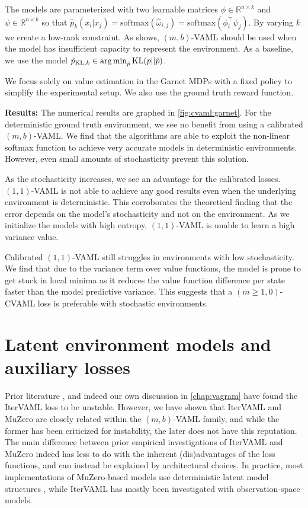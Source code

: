 The models are parameterized with two learnable matrices $\phi \in \mathbb{R}^{n\times k}$ and $\psi \in \mathbb{R}^{n\times k}$ so that $\hat{p}_k(x_i| x_j)  = \mathrm{softmax}(\hat{\omega}_{i,j}) = \mathrm{softmax}(\phi_i^\top \psi_j)$.
By varying $k$ we create a low-rank constraint.
As \textcite{vaml} shows, $(m,b)$-VAML should be used when the model has insufficient capacity to represent the environment.
As a baseline, we use the model $\hat{p}_{\mathrm{KL}, k}\in \operatorname*{arg\,min}_{\hat{p}} \mathrm{KL}(p||\hat{p})$.

We focus solely on value estimation in the Garnet MDPs with a fixed policy to simplify the experimental setup.
We also use the ground truth reward function.

\textbf{Results:}
The numerical results are graphed in \autoref{fig:cvaml:garnet}.
For the deterministic ground truth environment, we see no benefit from using a calibrated $(m,b)$-VAML.
We find that the algorithms are able to exploit the non-linear softmax function to achieve very accurate models in deterministic environments.
However, even small amounts of stochasticity prevent this solution.

As the stochasticity increases, we see an advantage for the calibrated losses.
$(1,1)$-VAML is not able to achieve any good results even when the underlying environment is deterministic.
This corroborates the theoretical finding that the error depends on the model's stochasticity and not on the environment.
As we initialize the models with high entropy, $(1,1)$-VAML is unable to learn a high variance value.

Calibrated $(1,1)$-VAML still struggles in environments with low stochasticity.
We find that due to the variance term over value functions, the model is prone to get stuck in local minima as it reduces the value function difference per state faster than the model predictive variance.
This suggests that a $(m\geq1,0)$-CVAML loss is preferable with stochastic environments.

\section{Latent environment models and auxiliary losses}
Prior literature \parencite{lovatto2020decision}, and indeed our own discussion in \autoref{chap:vagram} have found the IterVAML loss to be unstable.
However, we have shown that IterVAML and MuZero are closely related within the $(m,b)$-VAML family, and while the former has been criticized for instability, the later does not have this reputation.
The main difference between prior empirical investigations of IterVAML and MuZero indeed has less to do with the inherent (dis)advantages of the loss functions, and can instead be explained by architectural choices.
In practice, most implementations of MuZero-based models use deterministic latent model structures \cite{schrittwieser2020mastering,ye2021mastering,hansen2022temporal,antonoglou2022planning}, while IterVAML has mostly been investigated with observation-space models.


